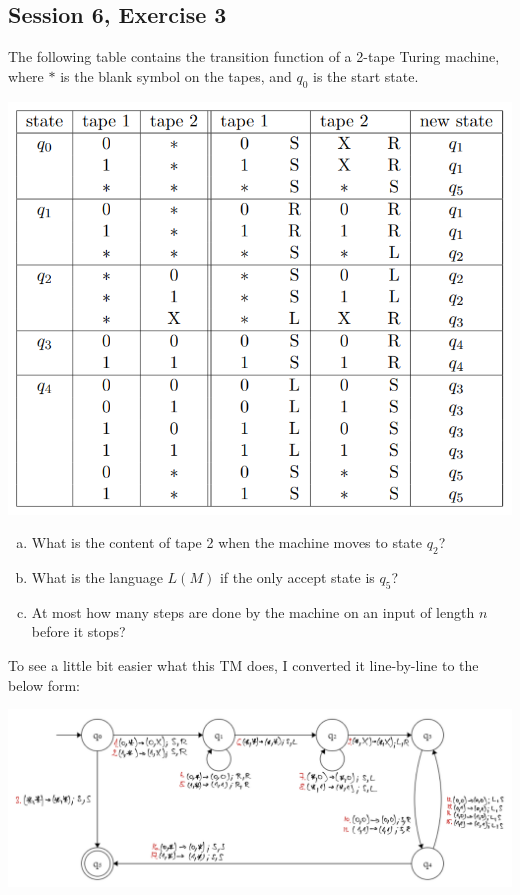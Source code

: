 \subsection {Session 6, Exercise 3}

\label{6_3}


The following table contains the transition function of a 2-tape Turing machine, where $*$ is the blank symbol on the tapes, and $q_0$ is the start state.

\begin{center}
\includegraphics[width=0.7\linewidth]{06/6_3_task.png}
\end{center}

\begin{enumerate}[a)]
    \item What is the content of tape 2 when the machine moves to state $q_2$?
    \item What is the language $L(M)$ if the only accept state is $q_5$?
    \item At most how many steps are done by the machine on an input of length $n$ before it stops?
\end{enumerate}


To see a little bit easier what this TM does, I converted it line-by-line to the below form:

\includegraphics[width=\linewidth]{06/6_3_canvas.png}

